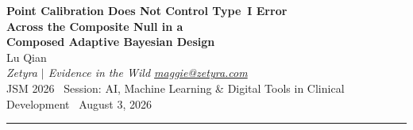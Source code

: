 \documentclass[11pt]{article}
\begin{document}
\begin{center}
  {\LARGE\bfseries Point Calibration Does Not Control Type~I Error\\[4pt]
  Across the Composite Null in a\\[4pt]
  Composed Adaptive Bayesian Design}\\[14pt]
  {\large Lu Qian}\\[4pt]
  {\normalsize\itshape Zetyra $\vert$ Evidence in the Wild \quad
  \href{mailto:maggie@zetyra.com}{maggie@zetyra.com}}\\[6pt]
  {\small JSM 2026 \textbullet\ Session: AI, Machine Learning \& Digital Tools
  in Clinical Development \textbullet\ August 3, 2026}
\end{center}
\vspace{4pt}
\hrule
\vspace{8pt}
\end{document}
